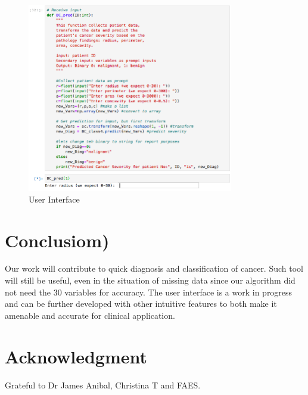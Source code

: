 \documentclass[conference]{IEEEtran}
\begin{document}
\begin{figure}[htbp]
\centerline{\includegraphics [width = 9cm] {newtool.png}}
\caption{User Interface}
\label{fig}
\end{figure}

\section{Conclusiom)}
Our work will contribute to quick diagnosis and classification of cancer. Such tool will still be useful, even in the situation of missing data since our algorithm did not need the 30 variables for accuracy. The user interface is a work in progress and can be further developed with other intuitive features to both make it amenable and accurate for clinical application. 



\section*{Acknowledgment}

Grateful to Dr James Anibal, Christina T and FAES.
\end{document}
